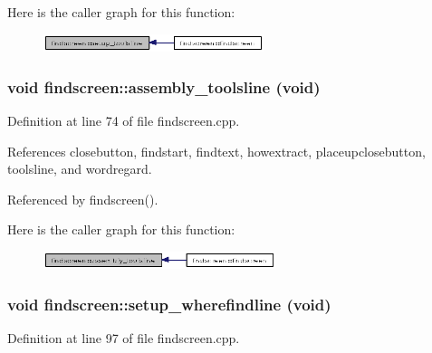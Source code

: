 Here is the caller graph for this function:\begin{figure}[H]
\begin{center}
\leavevmode
\includegraphics[width=182pt]{classfindscreen_21d3d00b4559ddbafc3cf6332a422a16_icgraph}
\end{center}
\end{figure}
\subsubsection{\setlength{\rightskip}{0pt plus 5cm}void findscreen::assembly\_\-toolsline (void)\hspace{0.3cm}{\tt  [private]}}\label{classfindscreen_88fd4b839652ca0b18ad6e9c270d1c61}




Definition at line 74 of file findscreen.cpp.

References closebutton, findstart, findtext, howextract, placeupclosebutton, toolsline, and wordregard.

Referenced by findscreen().

Here is the caller graph for this function:\begin{figure}[H]
\begin{center}
\leavevmode
\includegraphics[width=192pt]{classfindscreen_88fd4b839652ca0b18ad6e9c270d1c61_icgraph}
\end{center}
\end{figure}
\subsubsection{\setlength{\rightskip}{0pt plus 5cm}void findscreen::setup\_\-wherefindline (void)\hspace{0.3cm}{\tt  [private]}}\label{classfindscreen_2adcd1d1239878bd53219355a809308c}




Definition at line 97 of file findscreen.cpp.

